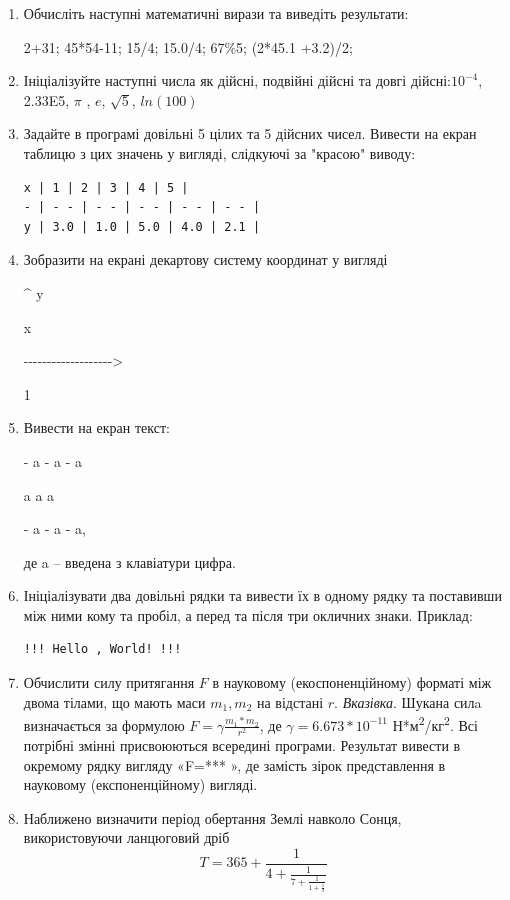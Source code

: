 \documentclass[]{article}
\begin{document}
\begin{enumerate}
\def\labelenumi{\arabic{enumi}.}
\item
Обчисліть наступні математичні вирази та виведіть результати:

2+31; 45*54-11; 15/4; 15.0/4; 67\%5; (2*45.1 +3.2)/2;

\item
Ініціалізуйте наступні числа як дійсні, подвійні дійсні та довгі
дійсні:\(10^{- 4}\), 2.33E5, \(\pi\) , \(e\), \(\sqrt{5}\), \(ln(100)\)
\item
Задайте в програмі довільні 5 цілих та 5 дійсних чисел. Вивести на екран таблицю
з цих значень у вигляді, слідкуючі за "красою" виводу:
\begin{verbatim}
x | 1 | 2 | 3 | 4 | 5 |
- | - - | - - | - - | - - | - - |
y | 3.0 | 1.0 | 5.0 | 4.0 | 2.1 |
\end{verbatim}
\item
Зобразити на екрані декартову систему координат у вигляді

\^{} y

\textbar{} x

-\/-\/-\/-\/-\/-\/-\/-\/-\/-\/-\/-\/-\/-\/-\/-\/-\/-\/-\textgreater{}

\textbar{} 1

\textbar{}
\item
Вивести на екран текст:

-\/ a -\/ a -\/ a

a \textbar{} a \textbar{} a

-\/ a -\/ a -\/ a,

де a -- введена з клавіатури цифра.

\item
Ініціалізувати два довільні рядки та вивести їх в одному рядку та
поставивши між ними кому та пробіл, а перед та після три окличних знаки.
Приклад:
\begin{verbatim}
!!! Hello , World! !!!
\end{verbatim}

\item
Обчислити силу притягання $F$ в науковому (екоспоненційному) форматі між двома тілами,
  що мають маси $m_{1},m_{2}$ на відстані $r$. 
  \emph{\emph{Вказівка}}. Шукана силa визначається за формулою 
  $ F=\gamma \frac{m_{1}*m_{2}}{r^{2}}$,
  де $\gamma = 6.673*10^{-11}$ Н*м\textsuperscript{2}/кг\textsuperscript{2}. Всі потрібні змінні
  присвоюються всередині програми. Результат вивести в окремому рядку
  вигляду «F=*** », де замість зірок представлення в науковому
  (експоненційному) вигляді.
\item
Наближено визначити період обертання Землі навколо Сонця, використовуючи
ланцюговий дріб
\[T = \mathrm{365} + \frac{1}{4 + \frac{1}{7 + \frac{1}{1 + \frac{1}{3}}}}\]


\end{enumerate}
\end{document}
